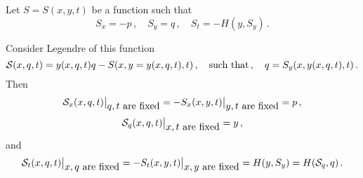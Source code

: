

\baselineskip=14pt
\def\vare {\varepsilon}
\def\A {{\bf A}}
\def\t {\tilde}
\def\a {\alpha}
\def\K {{\bf K}}
\def\N {{\bf N}}
\def\V {{\cal V}}
\def\s {{\sigma}}
\def\s {{\sigma}}
\def\p{\partial}
\def\vare{{\varepsilon}}
\def\Q {{\bf Q}}
\def\D {{\cal D}}
\def\G {{\Gamma}}
\def\C {{\bf C}}
\def\M {{\cal M}}
\def\Z {{\bf Z}}
\def\U  {{\cal U}}
\def\H {{\cal H}}
\def\R  {{\bf R}}
\def\E  {{\bf E}}
\def\l {\lambda}
\def\ll {{\bf l}}
\def\degree {{\bf {\rm degree}\,\,}}
\def \finish {${\,\,\vrule height1mm depth2mm width 8pt}$}
\def \m {\medskip}
\def\p {\partial}
\def\r {{\bf r}}
\def\pt {{\bf p}}
\def\v {{\bf v}}
\def\n {{\bf n}}
\def\t {{\bf t}}
\def\b {{\bf b}}
\def\c {{\bf c }}
\def\e{{\bf e}}
\def\ac {{\bf a}}
\def \X   {{\bf X}}
\def \Y   {{\bf Y}}
\def \x   {{\bf x}}
\def \y   {{\bf y}}
\def \G{{\cal G}}
\def\w {{\omega}}
\def \Tr  {{\rm Tr\,}}
\def\V {{\cal V}}
\def\S {{\cal S}}

   Let $S=S(x,y,t)$  be a function such that
               $$
          S_x=-p\,,\quad S_y=q\,,\quad S_t=-H(y,S_y)\,.
                     $$

Consider Legendre of this function
              $$
\S(x,q,t)=y(x,q,t)q-S(x,y=y(x,q,t),t)\,,\quad
\hbox {such that}\,,\quad q=S_y(x,y(x,q,t),t)\,.
              $$
Then
          $$
  \S_x(x,q,t)\big\vert_{\hbox {$q,t$ are fixed}}=
  -S_x(x,y,t)\big\vert_{\hbox {$y,t$ are fixed}}=p\,,
          $$
          $$
  \S_q(x,q,t)\big\vert_{\hbox {$x,t$ are fixed}}=
             y\,,
          $$
and
       $$
\S_t(x,q,t)\big\vert_{\hbox {$x,q$ are fixed}}=
-S_t(x,y,t)\big\vert_{\hbox {$x,y$ are fixed}}=H(y,S_y)=H(\S_q,q)\,.
       $$


\bye
